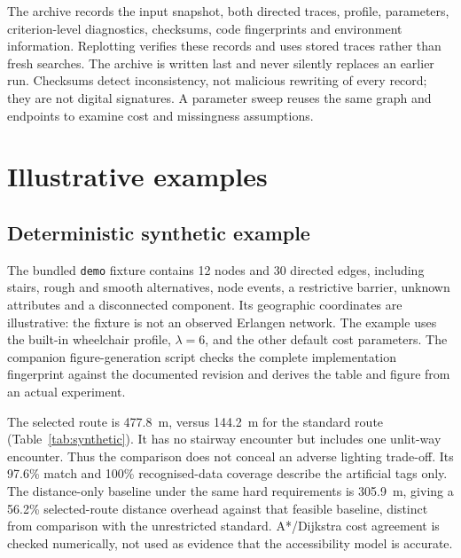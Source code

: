 \documentclass[preprint,12pt,a4paper]{elsarticle}
\begin{document}
The archive records the input snapshot, both directed traces, profile,
parameters, criterion-level diagnostics, checksums, code fingerprints and
environment information. Replotting verifies these records and uses stored
traces rather than fresh searches. The archive is written last and never
silently replaces an earlier run. Checksums detect inconsistency, not malicious
rewriting of every record; they are not digital signatures. A parameter sweep
reuses the same graph and endpoints to examine cost and missingness assumptions.

\section{Illustrative examples}
\label{sec:examples}
\subsection{Deterministic synthetic example}
\label{sec:synthetic}
The bundled \texttt{demo} fixture contains 12 nodes and 30 directed edges,
including stairs, rough and smooth alternatives, node events, a restrictive
barrier, unknown attributes and a disconnected component. Its geographic
coordinates are illustrative: the fixture is not an observed Erlangen network.
The example uses the built-in wheelchair profile, $\lambda=6$, and the other
default cost parameters. The companion figure-generation script checks the
complete implementation fingerprint against the documented revision and
derives the table and figure from an actual experiment.

\begin{table}[!ht]
\centering
\small

\caption{Synthetic paired-route assessment under the selected wheelchair profile.
Changes are selected minus standard. The standard route crosses a mapped
stairway and is infeasible under that profile; its score is therefore undefined.
The two blocked traversals are graph edges, not two separate stairways.
Stair and wheelchair-restriction entries describe the same tagged feature.}
\label{tab:synthetic}
\end{table}

The selected route is 477.8~m, versus 144.2~m for the standard route
(Table~\ref{tab:synthetic}). It has no stairway encounter but includes one
unlit-way encounter. Thus the comparison does not conceal an adverse lighting
trade-off. Its 97.6\% match and 100\% recognised-data coverage describe the
artificial tags only. The distance-only baseline under the same hard
requirements is 305.9~m, giving a 56.2\% selected-route distance overhead against
that feasible baseline, distinct from comparison with the unrestricted
standard. A*/Dijkstra cost agreement is checked numerically, not used as
evidence that the accessibility model is accurate.
\end{document}
